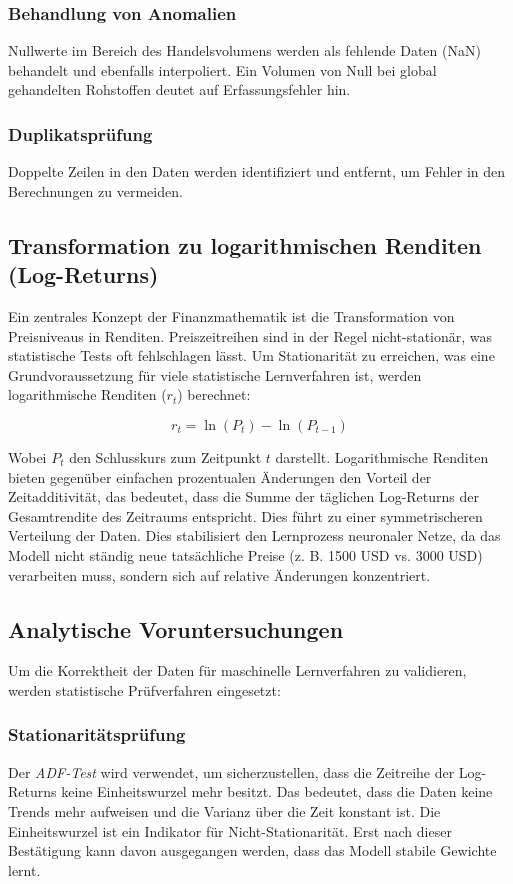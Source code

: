 \subsubsection{Behandlung von Anomalien}
Nullwerte im Bereich des Handelsvolumens werden als fehlende Daten (NaN) behandelt und ebenfalls interpoliert.
Ein Volumen von Null bei global gehandelten Rohstoffen deutet auf Erfassungsfehler hin.

\subsubsection{Duplikatsprüfung}
Doppelte Zeilen in den Daten werden identifiziert und entfernt, um Fehler in den Berechnungen zu vermeiden.

\subsection{Transformation zu logarithmischen Renditen (Log-Returns)}

Ein zentrales Konzept der Finanzmathematik ist die Transformation von Preisniveaus in Renditen.
Preiszeitreihen sind in der Regel nicht-stationär, was statistische Tests oft fehlschlagen lässt.
Um Stationarität zu erreichen, was eine Grundvoraussetzung für viele statistische Lernverfahren ist, werden logarithmische Renditen ($r_t$) berechnet:

\begin{equation}
    r_t = \ln(P_t) - \ln(P_{t-1})
\end{equation}

Wobei $P_t$ den Schlusskurs zum Zeitpunkt $t$ darstellt.
Logarithmische Renditen bieten gegenüber einfachen prozentualen Änderungen den Vorteil der Zeitadditivität, das bedeutet, dass die Summe der täglichen Log-Returns der Gesamtrendite des Zeitraums entspricht.
Dies führt zu einer symmetrischeren Verteilung der Daten.
Dies stabilisiert den Lernprozess neuronaler Netze, da das Modell nicht ständig neue tatsächliche Preise (z. B. 1500 USD vs. 3000 USD) verarbeiten muss, sondern sich auf relative Änderungen konzentriert.

\subsection{Analytische Voruntersuchungen}

Um die Korrektheit der Daten für maschinelle Lernverfahren zu validieren, werden statistische Prüfverfahren eingesetzt:

\subsubsection{Stationaritätsprüfung}
Der \emph{ADF-Test} wird verwendet, um sicherzustellen, dass die Zeitreihe der Log-Returns keine Einheitswurzel mehr besitzt.
Das bedeutet, dass die Daten keine Trends mehr aufweisen und die Varianz über die Zeit konstant ist.
Die Einheitswurzel ist ein Indikator für Nicht-Stationarität. Erst nach dieser Bestätigung kann davon ausgegangen werden, dass das Modell stabile Gewichte lernt.

